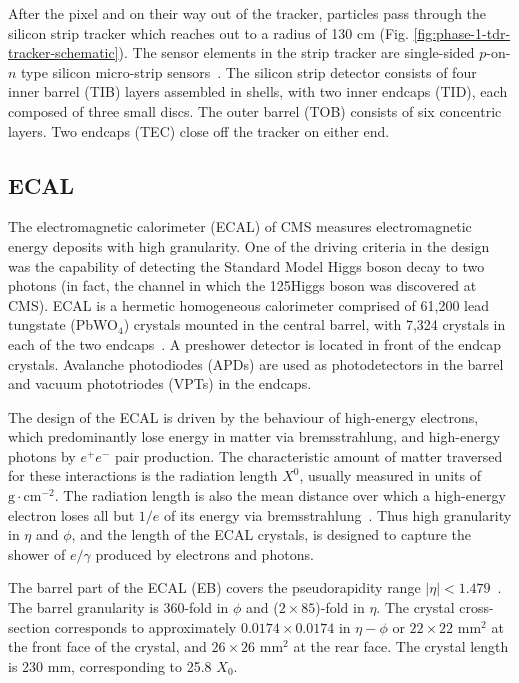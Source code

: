 After the pixel and on their way out of the tracker, particles pass through the silicon strip tracker which reaches out to a radius of 130 cm (Fig. \ref{fig:phase-1-tdr-tracker-schematic}). The sensor elements in the strip tracker are single-sided $p$-on-$n$ type silicon micro-strip sensors~\cite{CMS-2008-JINST-3-S08004}. The silicon strip detector consists of four inner barrel (TIB) layers assembled in shells, with two inner endcaps (TID), each composed of three small discs. The outer barrel (TOB) consists of six concentric layers. Two endcaps (TEC) close off the tracker on either end. 


\subsection{ECAL} 
The electromagnetic calorimeter (ECAL) of CMS measures electromagnetic energy deposits with high granularity. One of the driving criteria in the design was the capability of detecting the Standard Model Higgs boson decay to two photons (in fact, the channel in which the 125\GeV Higgs boson was discovered at CMS). 
ECAL is a hermetic homogeneous calorimeter comprised of 61,200 lead tungstate (PbWO$_4$) crystals mounted in the central barrel, with 7,324 crystals in each of the two endcaps~\cite{CMS-2008-JINST-3-S08004}. A preshower detector is located in front of the endcap crystals. Avalanche photodiodes (APDs) are used as photodetectors in the barrel and vacuum phototriodes (VPTs) in the endcaps. 

The design of the ECAL is driven by the behaviour of high-energy electrons, which predominantly lose energy in matter via bremsstrahlung, and high-energy photons by $e^+ e^-$ pair production. The characteristic amount of matter traversed for these interactions is the radiation length $X^0$, usually measured in units of $\text{g} \cdot \text{cm}^{-2}$. The radiation length is also the mean distance over which a high-energy electron loses all but $1/e$ of its energy via bremsstrahlung~\cite{workman_review_2022}. Thus high granularity in $\eta$ and $\phi$, and the length of the ECAL crystals, is designed to capture the shower of $e/\gamma$ produced by electrons and photons.

The barrel part of the ECAL (EB) covers the pseudorapidity range $|\eta| < 1.479$~\cite{CMS-2008-JINST-3-S08004}. The barrel granularity is 360-fold in $\phi$ and ($2 \times 85$)-fold in $\eta$. The crystal cross-section corresponds to approximately $0.0174 \times 0.0174$ in $\eta-\phi$ or $22 \times 22$ mm$^2$ at the front face of the crystal, and $26 \times 26$ mm$^2$ at the rear face. The crystal length is 230 mm, corresponding to 25.8 $X_0$.

